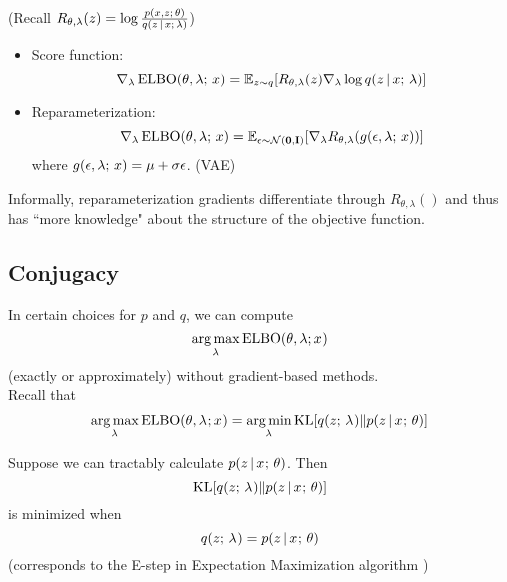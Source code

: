 \begin{frame}
(Recall $R_{\theta, \lambda}(z) = \log \frac{p(x,z ; \, \theta)}{q(z \,|\, x ; \, \lambda)}$)
\begin{itemize}
\item Score function:
\[
    \nabla_\lambda \operatorname*{ELBO}(\theta, \lambda ; \, x) = \mathbb{E}_{z \sim q}[R_{\theta, \lambda}(z) \nabla_\lambda \log q(z \,|\,  x  ; \, \lambda)]
    \]
    \item Reparameterization:
\[
    \nabla_\lambda \operatorname*{ELBO}(\theta, \lambda ; \, x)  = \mathbb{E}_{\epsilon \sim \mathcal{N}(\mathbf{0}, \mathbf{I})}[\nabla_\lambda R_{\theta, \lambda}(g(\epsilon, \lambda ; \, x))]
\]
    where $g(\epsilon, \lambda ; \, x) = \mu + \sigma \epsilon$. (VAE)
\end{itemize}
Informally, reparameterization gradients differentiate through $R_{\theta, \lambda}()$ and thus has ``more knowledge"
about the structure of the objective function.
\end{frame}

\subsection{Conjugacy}


\begin{frame}
In certain choices for $p$ and $q$, we can compute 
\[ \argmax_\lambda \ELBO(\theta, \lambda; x^{}) \]
(exactly or approximately) without gradient-based methods. \\
\air
Recall that 
\begin{align*}
     \argmax_{\lambda^{}} \ELBO(\theta, \lambda^{}; x^{}) =   \argmin_{\lambda^{}}  \KL[q(z  \param \lambda^{}) \Vert p(z \given x^{} \param \theta)] 
\end{align*}

\end{frame}

\begin{frame}
Suppose we can tractably calculate $p(z \,|\, x^{} ; \, \theta)$.
Then 
\[  \operatorname*{KL}[q(z ; \, \lambda^{}) \Vert p(z \,|\, x^{} ; \, \theta)]  \]
is minimized when 
\[ q(z ; \, \lambda^{}) = p(z \,|\, x^{} ; \, \theta) \]
(corresponds to the E-step in Expectation Maximization algorithm \citep{dempster77em})
\end{frame}

